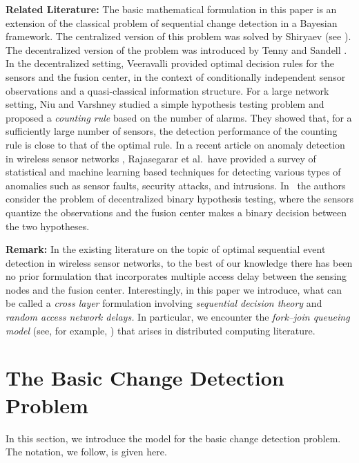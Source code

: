 \documentclass[acmtosn]{acmtrans2m}
\begin{document}
\noindent
\textbf{Related Literature:} The basic mathematical formulation in
this paper is an extension of the classical problem of sequential
change detection in a Bayesian framework. The centralized version of
this problem was solved by Shiryaev (see \cite{shiryayev}).  The
decentralized version of the problem was introduced by Tenny and
Sandell \cite{tennysandell81detection-distributed}. 
In the decentralized setting, Veeravalli
\cite{veeravalli01decentralized-quickest} provided optimal decision
rules for the sensors and the fusion center, in the context of
conditionally independent sensor observations and a quasi-classical
information structure.  For a large network setting, Niu and Varshney
\cite{stat-sig-proc.niu-varshney05large-wsn} studied a simple
hypothesis testing problem and proposed a \emph{counting rule} based
on the number of alarms. They showed that, for a sufficiently large
number of sensors, the detection performance of the counting rule is
close to that of the optimal rule.  In a recent article on anomaly
detection in wireless sensor networks
\cite{rajasegarar-etal08anamaly-detection}, Rajasegarar et al.\ have
provided a survey of statistical and machine learning based techniques
for detecting various types of anomalies such as sensor faults,
security attacks, and intrusions.
In~\cite{stat-sig-proc.aldosari-moura04decentralized-detection} the
authors consider the problem of decentralized binary hypothesis
testing, where the sensors quantize the observations and the fusion
center makes a binary decision between the two hypotheses.

\vspace{2mm}

{\bf Remark:}
In the existing literature on the topic of optimal sequential 
event detection in wireless sensor networks, to the best of our 
knowledge there has been no prior formulation that incorporates 
multiple access delay between the sensing nodes and the fusion 
center. Interestingly, in this paper we introduce, what can be 
called a \emph{cross layer} formulation involving {\em sequential 
decision theory} and {\em random access network delays.} 
In particular, we encounter the \emph{fork--join queueing model} 
(see, for example, \cite{baccelli-makowski}) that arises in 
distributed computing literature.

\section{The Basic Change Detection Problem}
\label{sec:problem_formulation}
In this section, we introduce the model for the basic change detection 
problem. The notation, we follow, is given here.
\end{document}
